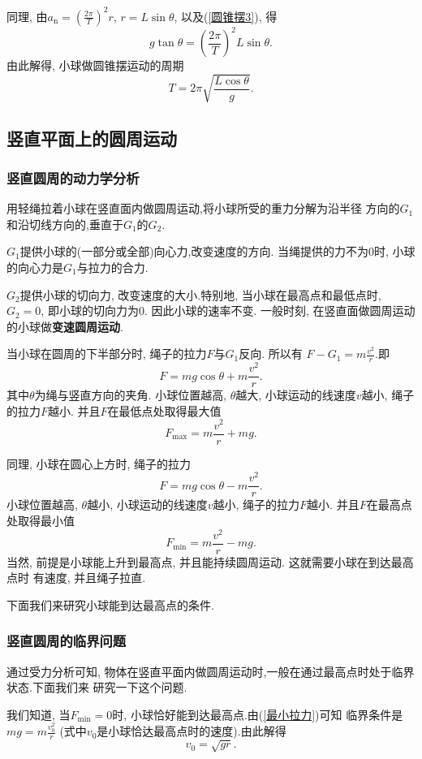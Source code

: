 \documentclass[11pt,a4paper]{ctexart}
\begin{document}
同理, 由$a_\mathrm{n}=(\displaystyle\frac{2\pi}{T})^2r$, $r = L \sin \theta$, 以及(\ref{圆锥摆3}), 得
$$g\tan \theta = \left(\displaystyle\frac{2\pi}{T}\right)^2 L \sin \theta.$$
由此解得, 小球做圆锥摆运动的周期$$T = 2\pi \sqrt{\frac{L \cos \theta}{g}}.$$

\subsection{竖直平面上的圆周运动}

\subsubsection{竖直圆周的动力学分析}

用轻绳拉着小球在竖直面内做圆周运动,将小球所受的重力分解为沿半径
方向的$G_1$和沿切线方向的,垂直于$G_1$的$G_2$.

$G_1$提供小球的(一部分或全部)向心力,改变速度的方向.
当绳提供的力不为0时, 小球的向心力是$G_1$与拉力的合力.

$G_2$提供小球的切向力, 改变速度的大小.特别地, 当小球在最高点和最低点时, $G_2 = 0$, 即小球的切向力为0.
因此小球的速率不变. 一般时刻, 在竖直面做圆周运动的小球做\textbf{变速圆周运动}.

当小球在圆周的下半部分时, 绳子的拉力$F$与$G_1$反向. 所以有
$F - G_1 = m\displaystyle\frac{v^2}{r}.$即$$F = mg\cos \theta + m\frac{v^2}{r}.$$
其中$\theta$为绳与竖直方向的夹角.
小球位置越高, $\theta$越大, 小球运动的线速度$v$越小, 绳子的拉力$F$越小.
并且$F$在最低点处取得最大值$$F_\mathrm{max} = m\frac{v^2}{r} + mg.$$

同理, 小球在圆心上方时, 绳子的拉力 $$F = mg\cos \theta - m\frac{v^2}{r}.$$
小球位置越高, $\theta$越小, 小球运动的线速度$v$越小, 绳子的拉力$F$越小.
并且$F$在最高点处取得最小值
\begin{equation}
	F_\text{min} = m\frac{v^2}{r} - mg.
	\label{最小拉力}
\end{equation}
当然, 前提是小球能上升到最高点, 并且能持续圆周运动. 这就需要小球在到达最高点时
有速度, 并且绳子拉直.

下面我们来研究小球能到达最高点的条件.

\subsubsection{竖直圆周的临界问题}

通过受力分析可知, 物体在竖直平面内做圆周运动时,一般在通过最高点时处于临界状态.下面我们来
研究一下这个问题.

我们知道, 当$F_\text{min} = 0$时, 小球恰好能到达最高点.由(\ref{最小拉力})可知
临界条件是$mg = m\displaystyle\frac{v_0^2}{r}$ (式中$v_0$是小球恰达最高点时的速度).由此解得
\begin{equation}
	v_0 = \sqrt{gr}.
	\label{临界速度}
\end{equation}
\end{document}
